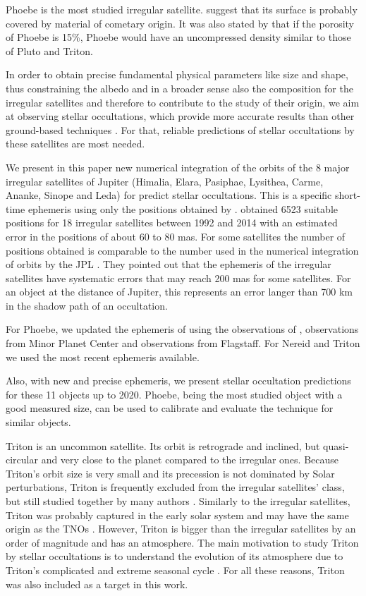 \documentclass[useAMS,usenatbib]{mn2e}
\begin{document}
Phoebe is the most studied irregular satellite. \cite{Clark2005} suggest that its surface is probably covered by material of cometary origin. It was also stated by \cite{Johnson2005} that if the porosity of Phoebe is 15\%, Phoebe would have an uncompressed density similar to those of Pluto and Triton.

In order to obtain precise fundamental physical parameters like size and shape, thus constraining the albedo and in a broader sense also the composition for the irregular satellites and therefore to contribute to the study of their origin, we aim at observing stellar occultations, which provide  more accurate results than other ground-based techniques \citep{Sicardy2011, Ortiz2012, Braga-Ribas2014}. For that, reliable predictions of stellar occultations by these satellites are most needed.

We present in this paper new numerical integration of the orbits of the 8 major irregular satellites of Jupiter (Himalia, Elara, Pasiphae, Lysithea, Carme, Ananke, Sinope and Leda) for predict stellar occultations. This is a specific short-time ephemeris using only the positions obtained by \cite{GomesJunior2015}. \cite{GomesJunior2015} obtained 6523 suitable positions for 18 irregular satellites between 1992 and 2014 with an estimated error in the positions of about 60 to 80 mas. For some satellites the number of positions obtained is comparable to the number used in the numerical integration of orbits by the JPL \citep{Jacobson2012}. They pointed out that the ephemeris of the irregular satellites have systematic errors that may reach 200 mas for some satellites. For an object at the distance of Jupiter, this represents an error langer than 700 km in the shadow path of an occultation.

For Phoebe, we updated the ephemeris of \cite{Desmars2013} using the observations of \cite{GomesJunior2015}, observations from Minor Planet Center and observations from Flagstaff. For Nereid and Triton we used the most recent ephemeris available.

Also, with new and precise ephemeris, we present stellar occultation predictions for these 11 objects up to 2020. Phoebe, being the most studied object with a good measured size, can be used to calibrate and evaluate the technique for similar objects.
 
Triton is an uncommon satellite. Its orbit is retrograde and inclined, but quasi-circular and very close to the planet compared to the irregular ones. Because Triton's orbit size is very small and its precession is not dominated by Solar perturbations, Triton is frequently excluded from the irregular satellites' class, but still studied together by many authors \citep{Sheppard2005, Jewitt2007}. Similarly to the irregular satellites, Triton was probably captured in the early solar system and may have the same origin as the TNOs \citep{Agnor2006}. However, Triton is bigger than the irregular satellites by an order of magnitude and has an atmosphere. The main motivation to study Triton by stellar occultations is to understand the evolution of its atmosphere due to Triton's complicated and extreme seasonal cycle \citep{McKinnon2007, Elliot_2000}. For all these reasons, Triton was also included as a target in this work.
\end{document}
